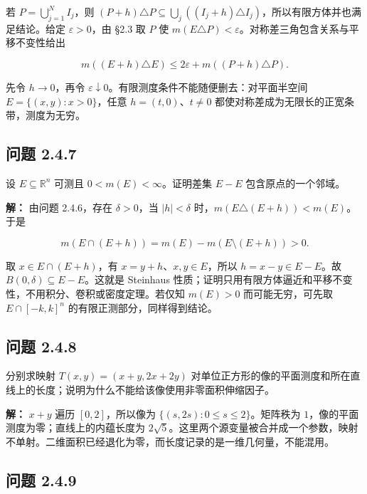 \documentclass[11pt,a4paper]{article}
\begin{document}
若 \(P=\bigcup_{j=1}^NI_j\)，则
\((P+h)\triangle P\subseteq\bigcup_j((I_j+h)\triangle I_j)\)，所以有限方体并也满足结论。给定
\(\varepsilon>0\)，由 §2.3 取 \(P\) 使
\(m(E\triangle P)<\varepsilon\)。对称差三角包含关系与平移不变性给出

\begin{equation*}
m((E+h)\triangle E)\le2\varepsilon+m((P+h)\triangle P).
\end{equation*}

先令 \(h\to0\)，再令
\(\varepsilon\downarrow0\)。有限测度条件不能随便删去：对平面半空间
\(E=\{(x,y):x>0\}\)，任意 \(h=(t,0)\)、\(t\ne0\)
都使对称差成为无限长的正宽条带，测度为无穷。

\subsection{问题 2.4.7}\label{ux95eeux9898-2.4.7}

设 \(E\subseteq\mathbb R^n\) 可测且 \(0<m(E)<\infty\)。证明差集 \(E-E\)
包含原点的一个邻域。

\textbf{解：} 由问题 2.4.6，存在 \(\delta>0\)，当 \(|h|<\delta\)
时，\(m(E\triangle(E+h))<m(E)\)。于是

\begin{equation*}
m(E\cap(E+h))=m(E)-m(E\setminus(E+h))>0.
\end{equation*}

取 \(x\in E\cap(E+h)\)，有 \(x=y+h\)、\(x,y\in E\)，所以
\(h=x-y\in E-E\)。故 \(B(0,\delta)\subseteq E-E\)。这就是 Steinhaus
性质；证明只用有限方体逼近和平移不变性，不用积分、卷积或密度定理。若仅知
\(m(E)>0\) 而可能无穷，可先取 \(E\cap[-k,k]^n\)
的有限正测部分，同样得到结论。

\subsection{问题 2.4.8}\label{ux95eeux9898-2.4.8}

分别求映射 \(T(x,y)=(x+y,2x+2y)\)
对单位正方形的像的平面测度和所在直线上的长度；说明为什么不能给该像使用非零面积伸缩因子。

\textbf{解：} \(x+y\) 遍历 \([0,2]\)，所以像为
\(\{(s,2s):0\le s\le2\}\)。矩阵秩为
\(1\)，像的平面测度为零；直线上的内蕴长度为
\(2\sqrt5\)。这里两个源变量被合并成一个参数，映射不单射。二维面积已经退化为零，而长度记录的是一维几何量，不能混用。

\subsection{问题 2.4.9}\label{ux95eeux9898-2.4.9}
\end{document}
